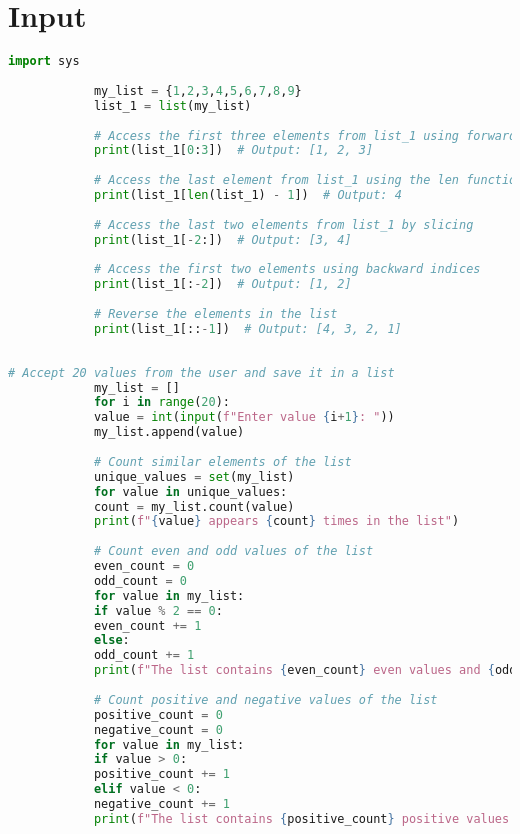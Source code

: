 \documentclass{article}
\begin{document}
	\section{\textbf{Input}}
		\begin{lstlisting}[language=python, caption={Exercise 1 Input}]
			import sys
			
			my_list = {1,2,3,4,5,6,7,8,9}
			list_1 = list(my_list)
			
			# Access the first three elements from list_1 using forward indices
			print(list_1[0:3])  # Output: [1, 2, 3]
			
			# Access the last element from list_1 using the len function
			print(list_1[len(list_1) - 1])  # Output: 4
			
			# Access the last two elements from list_1 by slicing
			print(list_1[-2:])  # Output: [3, 4]
			
			# Access the first two elements using backward indices
			print(list_1[:-2])  # Output: [1, 2]
			
			# Reverse the elements in the list
			print(list_1[::-1])  # Output: [4, 3, 2, 1]
			
		\end{lstlisting}
	
		\begin{lstlisting}[language=python, caption={Exercise 2 Input}]
			# Accept 20 values from the user and save it in a list
			my_list = []
			for i in range(20):
			value = int(input(f"Enter value {i+1}: "))
			my_list.append(value)
			
			# Count similar elements of the list
			unique_values = set(my_list)
			for value in unique_values:
			count = my_list.count(value)
			print(f"{value} appears {count} times in the list")
			
			# Count even and odd values of the list
			even_count = 0
			odd_count = 0
			for value in my_list:
			if value % 2 == 0:
			even_count += 1
			else:
			odd_count += 1
			print(f"The list contains {even_count} even values and {odd_count} odd values")
			
			# Count positive and negative values of the list
			positive_count = 0
			negative_count = 0
			for value in my_list:
			if value > 0:
			positive_count += 1
			elif value < 0:
			negative_count += 1
			print(f"The list contains {positive_count} positive values and {negative_count} negative values")
			
		\end{lstlisting}
		
\end{document}
